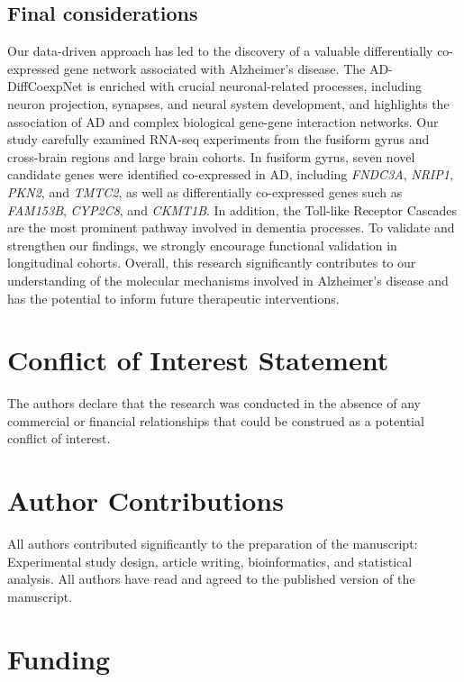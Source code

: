\documentclass[utf8]{FrontiersinHarvard} %
\begin{document}
\subsection{Final considerations}

Our data-driven approach has led to the discovery of a valuable differentially co-expressed gene network associated with Alzheimer's disease. The AD-DiffCoexpNet is enriched with crucial neuronal-related processes, including neuron projection, synapses, and neural system development, and highlights the association of AD and complex biological gene-gene interaction networks. Our study carefully examined RNA-seq experiments from the fusiform gyrus and cross-brain regions and large brain cohorts. In fusiform gyrus, seven novel candidate genes were identified co-expressed in AD, including \textit{FNDC3A}, \textit{NRIP1}, \textit{PKN2}, and \textit{TMTC2}, as well as differentially co-expressed genes such as \textit{FAM153B}, \textit{CYP2C8}, and \textit{CKMT1B}. In addition, the Toll-like Receptor Cascades are the most prominent pathway involved in dementia processes. To validate and strengthen our findings, we strongly encourage functional validation in longitudinal cohorts. Overall, this research significantly contributes to our understanding of the molecular mechanisms involved in Alzheimer's disease and has the potential to inform future therapeutic interventions.


\section*{Conflict of Interest Statement}

The authors declare that the research was conducted in the absence of any commercial or financial relationships that could be construed as a potential conflict of interest.

\section*{Author Contributions}

All authors contributed significantly to the preparation of the manuscript: Experimental study design, article writing, bioinformatics, and statistical analysis. All authors have read and agreed to the published version of the manuscript.

\section*{Funding}
\end{document}
